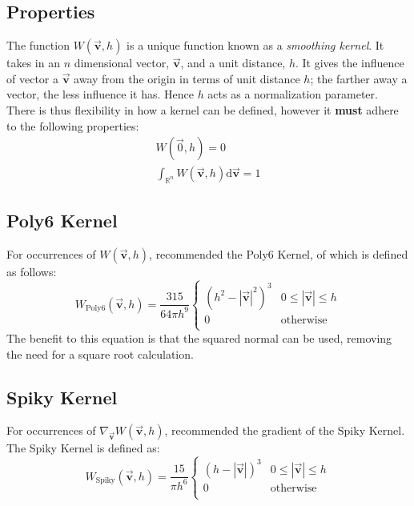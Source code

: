 \documentclass[sigplan,screen]{acmart}
\begin{document}
\subsection{Properties}
The function $W(\vec{\mathbf{v}}, h)$ is a unique function known as a \textit{smoothing kernel}. It takes in an $n$ dimensional vector, $\vec{\mathbf{v}}$, and a unit distance, $h$. It gives the influence of vector a $\vec{\mathbf{v}}$ away from the origin in terms of unit distance $h$; the farther away a vector, the less influence it has. Hence $h$ acts as a normalization parameter. There is thus flexibility in how a kernel can be defined, however it \textbf{must} adhere to the following properties:
\begin{align}
  W(\vec{0}, h) = 0\\
  \int_{\mathbb{R}^n} W(\vec{\mathbf{v}}, h) \text{d}\vec{\mathbf{v}} = 1
\end{align}

\subsection{Poly6 Kernel}

For occurrences of $W(\vec{\mathbf{v}}, h)$, \cite{Muller} recommended the Poly6 Kernel, of which is defined as follows:
\begin{equation}
  W_{\text{Poly6}}(\vec{\mathbf{v}}, h) = \frac{315}{64 \pi h^9} \begin{cases}
    (h^2 - |\vec{\mathbf{v}}|^2)^3 & 0 \leq |\vec{\mathbf{v}}| \leq h\\
    0 & \text{otherwise}\\
  \end{cases}
\end{equation}
The benefit to this equation is that the squared normal can be used, removing the need for a square root calculation.

\subsection{Spiky Kernel}

For occurrences of $\nabla_{\vec{\mathbf{v}}} W(\vec{\mathbf{v}}, h)$, \cite{Muller} recommended the gradient of the Spiky Kernel. The Spiky Kernel is defined as:
\begin{equation}
  W_{\text{Spiky}}(\vec{\mathbf{v}}, h) = \frac{15}{\pi h^6} \begin{cases}
    (h - |\vec{\mathbf{v}}|)^3 & 0 \leq |\vec{\mathbf{v}}| \leq h\\
    0 & \text{otherwise}\\
  \end{cases}
\end{equation}
\end{document}
